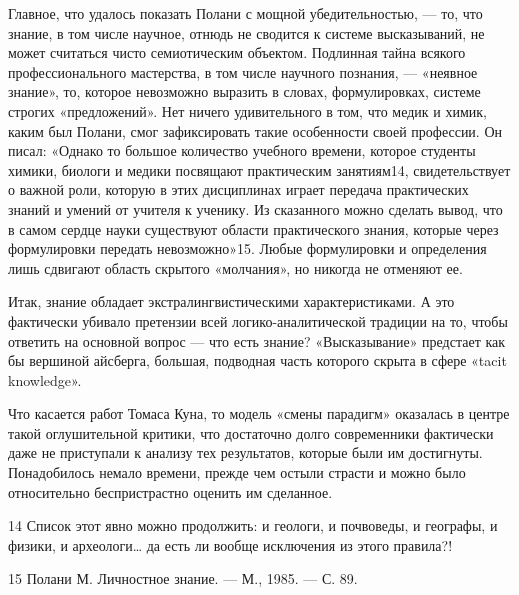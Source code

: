 \documentclass[11pt,a4paper]{article}
\begin{document}
Главное, что удалось показать Полани с мощной убедительностью, — то, что
знание, в том числе научное, отнюдь не сводится к системе высказываний, не
может считаться чисто семиотическим объектом. Подлинная тайна всякого
профессионального мастерства, в том числе научного познания, — «неявное
знание», то, которое невозможно выразить в словах, формулировках, системе
строгих «предложений». Нет ничего удивительного в том, что медик и химик,
каким был Полани, смог зафиксировать такие особенности своей профессии. Он
писал: «Однако то большое количество учебного времени, которое студенты
химики, биологи и медики посвящают практическим занятиям14, свидетельствует
о важной роли, которую в этих дисциплинах играет передача практических
знаний и умений от учителя к ученику. Из сказанного можно сделать вывод, что
в самом сердце науки существуют области практического знания, которые через
формулировки передать невозможно»15. Любые формулировки и определения лишь
сдвигают область скрытого «молчания», но никогда не отменяют ее.

Итак, знание обладает экстралингвистическими характеристиками. А это
фактически убивало претензии всей логико-аналитической традиции на то, чтобы
ответить на основной вопрос — что есть знание? «Высказывание» предстает как бы
вершиной айсберга, большая, подводная часть которого скрыта в сфере «tacit
knowledge».

Что касается работ Томаса Куна, то модель «смены парадигм» оказалась в
центре такой оглушительной критики, что достаточно долго современники
фактически даже не приступали к анализу тех результатов, которые были им
достигнуты. Понадобилось немало времени, прежде чем остыли страсти и можно
было относительно беспристрастно оценить им сделанное.

14 Список этот явно можно продолжить: и геологи, и почвоведы, и географы, и
физики, и археологи… да есть ли вообще исключения из этого правила?!

15 Полани М. Личностное знание. — М., 1985. — С. 89.
\end{document}
